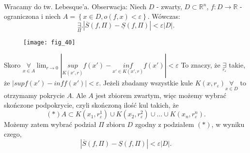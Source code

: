 \documentclass[../main.tex]{subfiles}
\begin{document}
    Wracamy do tw. Lebesque'a.
    Obserwacja: Niech $D$ - zwarty, $D\subset \mathbb{R}^n$, $f: D\to \mathbb{R}$ - ograniczona i niech $A = \left\{ x\in D, o(f,x) < \varepsilon \right\} $. Wówczas:
    \[
        \underset{\Pi}{\exists} . |\overline{S}(f,\Pi) - \underline{S}(f,\Pi)|<\varepsilon |D|
    .\]
    \begin{figure}[h]
        \centering
        \texttt{[image: fig\_40]}
    \end{figure}
    \begin{dowod}
        Skoro $\underset{x\in A}{\forall} \lim_{r\to 0} | \underset{K(x',r)}{sup} f(x') - \underset{x'\in K(x',r)}{inf} f(x') | < \varepsilon$
        To znaczy, że
        $\underset{r_\varepsilon}{\exists} $ takie, że $|sup f(x') - inf f(x') | < \varepsilon$.
        Jeżeli zbadamy wszystkie kule $K(x,r_\varepsilon) \underset{x\in D}{\forall} $ to otrzymamy pokrycie $A$. Ale $A$ jest zbiorem zwartym, więc możemy wybrać skończone podpokrycie, czyli skończoną ilość kul takich, że
        \[(*)
            A \subset K(x_1,r_\varepsilon^1)\cup K(x_2,r_\varepsilon^2)\cup\ldots\cup K(x_n,r_\varepsilon^n)
        .\]
        Możemy zatem wybrać podział $\Pi$ zbioru $D$ zgodny z podziałem $(*)$, w wyniku czego,
        \[
            |\overline{S}(f,\Pi) - \underline{S}(f,\Pi)|<\varepsilon |D|
        .\]
    \end{dowod}
\end{document}
